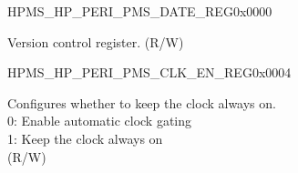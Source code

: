 \begin{register}{H}{PMS\_HP\_PERI\_PMS\_DATE\_REG}{0x0000}\label{regdesc:PMSHPPERIPMSDATEREG}
%
\regnewline%
\begin{regdesc}\begin{reglist}
\label{fielddesc:PMSHPPERIPMSDATE}\item [PMS\_HP\_PERI\_PMS\_DATE] Version control register. (R/W)
\end{reglist}\end{regdesc}
\end{register}


\begin{register}{H}{PMS\_HP\_PERI\_PMS\_CLK\_EN\_REG}{0x0004}\label{regdesc:PMSHPPERIPMSCLKENREG}
%
%
\regnewline%
\begin{regdesc}\begin{reglist}
\label{fielddesc:PMSHPPERIPMSCLKEN}\item [PMS\_HP\_PERI\_PMS\_CLK\_EN] Configures whether to keep the clock always on.\\
0: Enable automatic clock gating \\
1: Keep the clock always on\\ (R/W)
\end{reglist}\end{regdesc}
\end{register}


